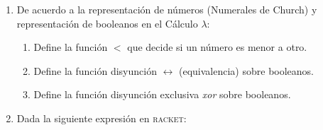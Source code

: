 \documentclass[letterpaper,11pt]{article}
\begin{document}
\begin{enumerate}
    \item De acuerdo a la representación de números (Numerales de Church) y 
    representación de booleanos en el Cálculo $\lambda$:
    \begin{enumerate}
        \item Define la función $<$ que decide si un número es menor a otro.

        \item Define la función disyunción $\leftrightarrow$ (equivalencia) 
        sobre booleanos.

        \item Define la función disyunción exclusiva \textit{xor} sobre 
        booleanos.
    \end{enumerate}

    \item Dada la siguiente expresión en \textsc{racket}:
\end{enumerate}
\end{document}
